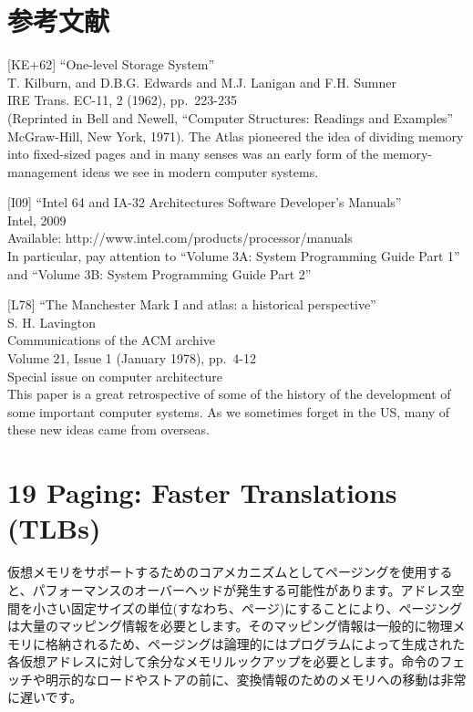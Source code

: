 \hypertarget{ux53c2ux8003ux6587ux732e-10}{%
\section*{参考文献}\label{ux53c2ux8003ux6587ux732e-10}}

{[}KE+62{]} ``One-level Storage System''\\
T. Kilburn, and D.B.G. Edwards and M.J. Lanigan and F.H. Sumner\\
IRE Trans. EC-11, 2 (1962), pp.~223-235\\
(Reprinted in Bell and Newell, ``Computer Structures: Readings and
Examples'' McGraw-Hill, New York, 1971). The Atlas pioneered the idea of
dividing memory into fixed-sized pages and in many senses was an early
form of the memory-management ideas we see in modern computer systems.

{[}I09{]} ``Intel 64 and IA-32 Architectures Software Developer's
Manuals''\\
Intel, 2009\\
Available: http://www.intel.com/products/processor/manuals\\
In particular, pay attention to ``Volume 3A: System Programming Guide
Part 1'' and ``Volume 3B: System Programming Guide Part 2''

{[}L78{]} ``The Manchester Mark I and atlas: a historical
perspective''\\
S. H. Lavington\\
Communications of the ACM archive\\
Volume 21, Issue 1 (January 1978), pp.~4-12\\
Special issue on computer architecture\\
This paper is a great retrospective of some of the history of the
development of some important computer systems. As we sometimes forget
in the US, many of these new ideas came from overseas.

\hypertarget{paging-faster-translations-tlbs}{%
\section*{19 Paging: Faster Translations
(TLBs)}\label{paging-faster-translations-tlbs}}

仮想メモリをサポートするためのコアメカニズムとしてページングを使用すると、パフォーマンスのオーバーヘッドが発生する可能性があります。アドレス空間を小さい固定サイズの単位(すなわち、ページ)にすることにより、ページングは大量のマッピング情報を必要とします。そのマッピング情報は一般的に物理メモリに格納されるため、ページングは論理的にはプログラムによって生成された各仮想アドレスに対して余分なメモリルックアップを必要とします。命令のフェッチや明示的なロードやストアの前に、変換情報のためのメモリへの移動は非常に遅いです。


